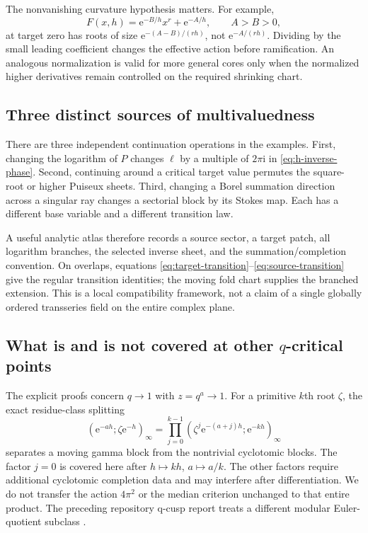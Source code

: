 \documentclass[11pt,a4paper]{article}
\numberwithin{equation}{section}
\theoremstyle{definition}
\theoremstyle{remark}\newtheorem{remark}[theorem]{Remark}
\newcommand{\ii}{\mathrm i}\newcommand{\e}{\mathrm e}
\begin{document}
The nonvanishing curvature hypothesis matters. For example,
\[
 F(x,h)=\e^{-B/h}x^r+\e^{-A/h},\qquad A>B>0,
\]
at target zero has roots of size $\e^{-(A-B)/(rh)}$, not
$\e^{-A/(rh)}$. Dividing by the small leading coefficient changes the
effective action before ramification. An analogous normalization is
valid for more general cores only when the normalized higher derivatives
remain controlled on the required shrinking chart.

\subsection{Three distinct sources of multivaluedness}
There are three independent continuation operations in the examples.
First, changing the logarithm of $P$ changes $\ell$ by a multiple of
$2\pi\ii$ in \eqref{eq:h-inverse-phase}. Second, continuing around a
critical target value permutes the square-root or higher Puiseux
sheets. Third, changing a Borel summation direction across a singular
ray changes a sectorial block by its Stokes map. Each has a different
base variable and a different transition law.

A useful analytic atlas therefore records a source sector, a target
patch, all logarithm branches, the selected inverse sheet, and the
summation/completion convention. On overlaps, equations
\eqref{eq:target-transition}--\eqref{eq:source-transition} give the
regular transition identities; the moving fold chart supplies the
branched extension. This is a local compatibility framework, not a
claim of a single globally ordered transseries field on the entire
complex plane.

\subsection{What is and is not covered at other \texorpdfstring{$q$}{q}-critical points}
The explicit proofs concern $q\to1$ with $z=q^a\to1$. For a primitive
$k$th root $\zeta$, the exact residue-class splitting
\begin{equation}\label{eq:root-split}
 (\e^{-ah};\zeta\e^{-h})_\infty
 =\prod_{j=0}^{k-1}
   (\zeta^j\e^{-(a+j)h};\e^{-kh})_\infty
\end{equation}
separates a moving gamma block from the nontrivial cyclotomic blocks.
The factor $j=0$ is covered here after $h\mapsto kh$, $a\mapsto a/k$.
The other factors require additional cyclotomic completion data and may
interfere after differentiation. We do not transfer the action
$4\pi^2$ or the median criterion unchanged to that entire product.
The preceding repository q-cusp report treats a different modular
Euler-quotient subclass \cite{prior}.
\end{document}
